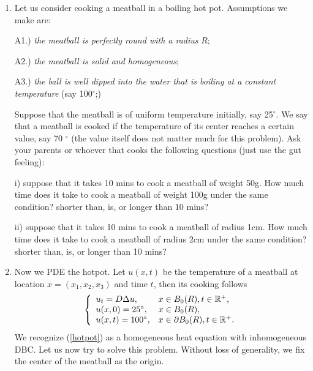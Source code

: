 \documentclass[6pt]{article}
\numberwithin{equation}{section}
\def\mathbb{\Bbb}
\begin{document}
\begin{enumerate}
(ii).  Solve (\ref{53}) in terms of infinite series.  Plot $u^{10}(x,t)$ for $t=0, t=0.01$, $t=0.05$ and $t=0.1$ over $(0,1)$ on the same graph.  You should observe that the initially discontinuity at $x=0$ is smeared out right away.  Then plot $u^{10}(x,t)$ for $t=10$ and the steady state in (i) on the same graph.

(iii).  Send $t$ to $\infty$ to rigorously confirm your observations in (ii).

\item Let us consider cooking a meatball in a boiling hot pot.  Assumptions we make are:

A1.) \emph{the meatball is perfectly round with a radius} $R$;

A2.) \emph{the meatball is solid and homogeneous};

A3.) \emph{the ball is well dipped into the water that is boiling at a constant temperature} (say 100$^{\circ}$;)

Suppose that the meatball is of uniform temperature initially, say 25$^{\circ}$.  We say that a meatball is cooked if the temperature of its center reaches a certain value, say 70 $^{\circ}$ (the value itself does not matter much for this problem).
Ask your parents or whoever that cooks the following questions (just use the gut feeling):

i) suppose that it takes 10 mins to cook a meatball of weight 50g.  How much time does it take to cook a meatball of weight 100g under the same condition? shorter than, is, or longer than 10 mins?

ii) suppose that it takes 10 mins to cook a meatball of radius 1cm.  How much time does it take to cook a meatball of radius 2cm under the same condition?  shorter than, is, or longer than 10 mins?

\item Now we PDE the hotpot.  Let $u(x,t)$ be the temperature of a meatball at location $x=(x_1,x_2,x_3)$ and time $t$, then its cooking follows
\begin{equation}\label{hotpot}
\left\{
\begin{array}{ll}
u_t=D\Delta u,& x\in B_0(R),t\in\mathbb R^+,\\
u(x,0)=25 \text{$^{\circ}$},&x\in B_0(R),\\
u(x,t)=100 \text{$^{\circ}$}, &x\in\partial B_0(R), t\in\mathbb R^+.
\end{array}
\right.
\end{equation}
We recognize (\ref{hotpot}) as a homogeneous heat equation with inhomogeneous DBC.  Let us now try to solve this problem.  Without loss of generality, we fix the center of the meatball as the origin.


\end{enumerate}
\end{document}
